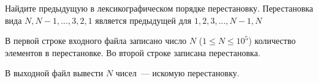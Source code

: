 

Найдите предыдущую в лексикографическом порядке перестановку. Перестановка вида $N, N - 1, ... , 3, 2, 1$ является предыдущей для $1, 2, 3, ... , N - 1, N$

\InputFile
В первой строке входного файла записано число $N$  ($1 \leqslant N \leqslant 10^5$)  количество элементов в перестановке. Во второй строке записана перестановка.

\OutputFile
В выходной файл вывести $N$ чисел~--- искомую перестановку.

